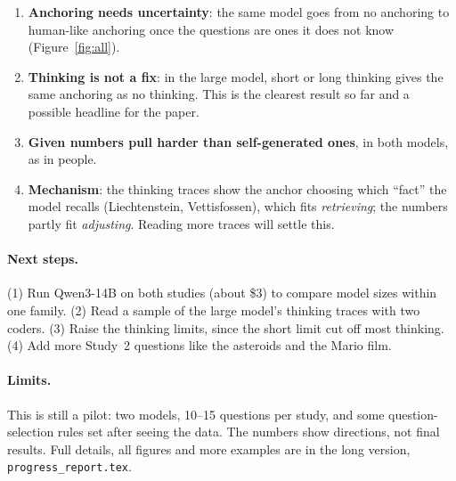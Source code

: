 \documentclass[11pt,a4paper]{article}
\begin{document}
\begin{enumerate}[leftmargin=*]
  \item \textbf{Anchoring needs uncertainty}: the same model goes from no anchoring to human-like anchoring once the questions are ones it does not know (Figure~\ref{fig:all}).
  \item \textbf{Thinking is not a fix}: in the large model, short or long thinking gives the same anchoring as no thinking. This is the clearest result so far and a possible headline for the paper.
  \item \textbf{Given numbers pull harder than self-generated ones}, in both models, as in people.
  \item \textbf{Mechanism}: the thinking traces show the anchor choosing which \enquote{fact} the model recalls (Liechtenstein, Vettisfossen), which fits \emph{retrieving}; the numbers partly fit \emph{adjusting}. Reading more traces will settle this.
\end{enumerate}

\paragraph{Next steps.} (1) Run Qwen3-14B on both studies (about \$3) to compare model sizes within one family. (2) Read a sample of the large model's thinking traces with two coders. (3) Raise the thinking limits, since the short limit cut off most thinking. (4) Add more Study~2 questions like the asteroids and the Mario film.

\paragraph{Limits.} This is still a pilot: two models, 10--15 questions per study, and some question-selection rules set after seeing the data. The numbers show directions, not final results. Full details, all figures and more examples are in the long version, \texttt{progress\_report.tex}.



\end{document}
